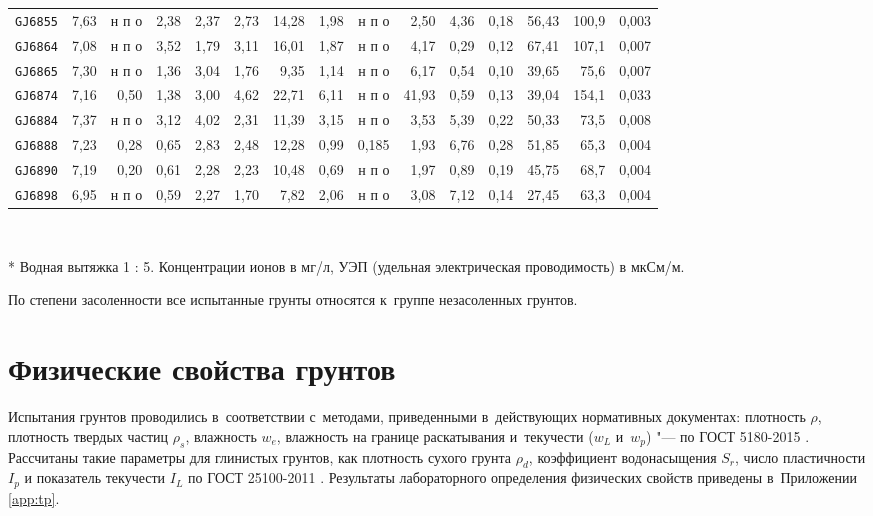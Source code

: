 \begin{sidewaystable}[p]
\begin{tabular}{@{}lrrrrrrrrrrrrrr@{}}
    \texttt{GJ6855} & 7,63 & н п о & 2,38 & 2,37 & 2,73 & 14,28 & 1,98 & н п о &  2,50 & 4,36 & 0,18 & 56,43 & 100,9 & 0,003 \\
    \texttt{GJ6864} & 7,08 & н п о & 3,52 & 1,79 & 3,11 & 16,01 & 1,87 & н п о &  4,17 & 0,29 & 0,12 & 67,41 & 107,1 & 0,007 \\
    \texttt{GJ6865} & 7,30 & н п о & 1,36 & 3,04 & 1,76 &  9,35 & 1,14 & н п о &  6,17 & 0,54 & 0,10 & 39,65 & 75,6  & 0,007 \\
    \texttt{GJ6874} & 7,16 &  0,50 & 1,38 & 3,00 & 4,62 & 22,71 & 6,11 & н п о & 41,93 & 0,59 & 0,13 & 39,04 & 154,1 & 0,033 \\
    \texttt{GJ6884} & 7,37 & н п о & 3,12 & 4,02 & 2,31 & 11,39 & 3,15 & н п о &  3,53 & 5,39 & 0,22 & 50,33 & 73,5  & 0,008 \\
    \texttt{GJ6888} & 7,23 &  0,28 & 0,65 & 2,83 & 2,48 & 12,28 & 0,99 & 0,185 &  1,93 & 6,76 & 0,28 & 51,85 & 65,3  & 0,004 \\
    \texttt{GJ6890} & 7,19 &  0,20 & 0,61 & 2,28 & 2,23 & 10,48 & 0,69 & н п о &  1,97 & 0,89 & 0,19 & 45,75 & 68,7  & 0,004 \\
    \texttt{GJ6898} & 6,95 & н п о & 0,59 & 2,27 & 1,70 &  7,82 & 2,06 & н п о &  3,08 & 7,12 & 0,14 & 27,45 & 63,3  & 0,004 \\
    \bottomrule 
    \end{tabular}
    \\ 
    \raggedright 
    {* Водная вытяжка 1 : 5. Концентрации ионов в мг/л, УЭП (удельная электрическая проводимость) в мкСм/м.}
\end{sidewaystable}


По степени засоленности все испытанные грунты относятся к~группе незасоленных грунтов.

\section{Физические свойства грунтов}

Испытания грунтов проводились в~соответствии с~методами, приведенными в~действующих нормативных документах:
плотность $\rho$, 
плотность твердых частиц $\rho_s$, 
влажность $w_e$, 
влажность на границе раскатывания и~текучести ($w_L$ и~$w_p$) "--- по ГОСТ 5180-2015 \cite{gost5180}. 
Рассчитаны такие параметры для глинистых грунтов, как
плотность сухого грунта $\rho_d$,  
коэффициент водонасыщения $S_r$, 
число пластичности $I_p$ 
и показатель текучести $I_L$ по ГОСТ 25100-2011 \cite{gost25100}.
Результаты лабораторного определения физических свойств приведены в~Приложении \ref{app:tp}.



